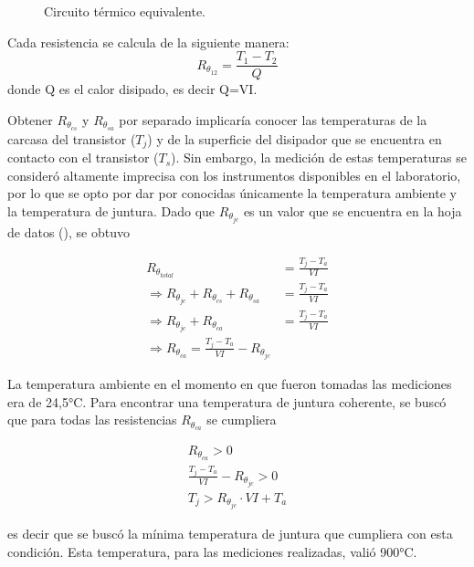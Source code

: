 \documentclass[
	a4paper, %
	10pt, %
	unnumberedsections, %
	twoside, %
]{LTJournalArticle}
\begin{document}
\begin{figure}[H]
\begin{centering}
    \caption{Circuito térmico equivalente.}
    \label{circuitoTermico}
    \end{centering}
\end{figure}

Cada resistencia se calcula de la siguiente manera:
\begin{equation*}
    R_{\theta_{12}} = \frac{T_1 - T_2}{Q}
\end{equation*}
donde Q es el calor disipado, es decir Q=VI.

Obtener $R_{\theta_{cs}}$ y $R_{\theta_{sa}}$ por separado implicaría conocer las temperaturas de la carcasa del transistor ($T_j$) y de la superficie del disipador que se encuentra en contacto con el transistor ($T_s$). Sin embargo, la medición de estas temperaturas se consideró altamente imprecisa con los instrumentos disponibles en el laboratorio, por lo que se opto por dar por conocidas únicamente la temperatura ambiente y la temperatura de juntura. Dado que $ R_{\theta_{jc}} $ es un valor que se encuentra en la hoja de datos (\cite{LM317}), se obtuvo

\begin{align*}
    R_{\theta_{total}} &= \frac{T_j - T_a}{VI} \\
    \Rightarrow R_{\theta_{jc}} + R_{\theta_{cs}} + R_{\theta_{sa}} &= \frac{T_j - T_a}{VI} \\
    \Rightarrow R_{\theta_{jc}} + R_{\theta_{ca}} &= \frac{T_j - T_a}{VI} \\
    \Rightarrow R_{\theta_{ca}} = \frac{T_j - T_a}{VI} - R_{\theta_{jc}}
\end{align*}

La temperatura ambiente en el momento en que fueron tomadas las mediciones era de 24,5°C.
Para encontrar una temperatura de juntura coherente, se buscó que para todas las resistencias $ R_{\theta_{ca}} $ se cumpliera

\begin{align*}
    R_{\theta_{ca}} > 0 \\ 
    \frac{T_j - T_a}{VI} - R_{\theta_{jc}} > 0 \\
    T_j > R_{\theta_{jc}} \cdot VI + T_a
\end{align*}

es decir que se buscó la mínima temperatura de juntura que cumpliera con esta condición. Esta temperatura, para las mediciones realizadas, valió 900°C.
\end{document}
